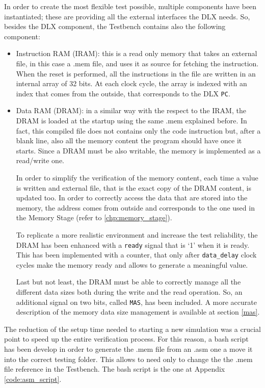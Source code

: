 In order to create the most flexible test possible, multiple components have been instantiated; these are providing all the external interfaces the DLX needs. So, besides the DLX component, the Testbench contains also the following component:
\begin{itemize} 
	\item Instruction RAM (IRAM): this is a read only memory that takes an external file, in this case a .mem file, and uses it as source for fetching the instruction. When the reset is performed, all the instructions in the file are written in an internal array of 32 bits. At each clock cycle, the array is indexed with an index that comes from the outside, that corresponds to the DLX \texttt{PC}.
	\item Data RAM (DRAM): in a similar way with the respect to the IRAM, the DRAM is loaded at the startup using the same .mem explained before. In fact, this compiled file does not contains only the code instruction but, after a blank line, also all the memory content the program should have once it starts. Since a DRAM must be also writable, the memory is implemented as a read/write one. 
	
	In order to simplify the verification of the memory content, each time a value is written and external file, that is the exact copy of the DRAM content, is updated too.
	In order to correctly access the data that are stored into the memory, the address comes from outside and corresponds to the one used in the Memory Stage (refer to \ref{chp:memory_stage}).
	
	To replicate a more realistic environment and increase the test reliability, the DRAM has been enhanced with a \texttt{ready} signal that is `1' when it is ready. This has been implemented with a counter, that only after \texttt{data\_delay} clock cycles make the memory ready and allows to generate a meaningful value.
	
	Last but not least, the DRAM must be able to correctly manage all the different data sizes both during the write and the read operation. So, an additional signal on two bits, called \texttt{MAS}, has been included. A more accurate description of the memory data size management is available at section \ref{mas}.
\end{itemize}

The reduction of the setup time needed to starting a new simulation was a crucial point to speed up the entire verification process. For this reason, a bash script has been develop in order to generate the .mem file from an .asm one a move it into the correct testing folder. This allows to need only to change the the .mem file reference in the Testbench. The bash script is the one at Appendix \ref{code:asm_script}.



